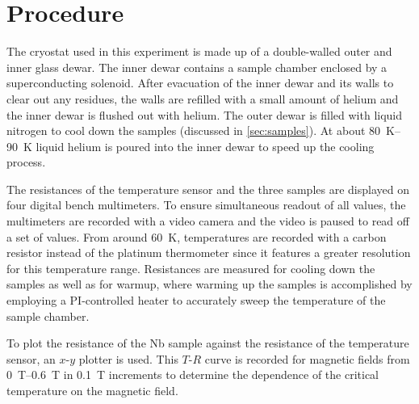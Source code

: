 \chapter{Procedure}
The cryostat used in this experiment is made up of a double-walled outer and inner glass dewar.
The inner dewar contains a sample chamber enclosed by a superconducting solenoid.
After evacuation of the inner dewar and its walls to clear out any residues, the walls are refilled with a small amount of helium and the inner dewar is flushed out with helium.
The outer dewar is filled with liquid nitrogen to cool down the samples (discussed in \autoref{sec:samples}).
At about \SIrange{80}{90}{\kelvin} liquid helium is poured into the inner dewar to speed up the cooling process.

The resistances of the temperature sensor and the three samples are displayed on four digital bench multimeters.
To ensure simultaneous readout of all values, the multimeters are recorded with a video camera and the video is paused to read off a set of values.
From around \SI{60}{\kelvin}, temperatures are recorded with a carbon resistor instead of the platinum thermometer since it features a greater resolution for this temperature range.
Resistances are measured for cooling down the samples as well as for warmup, where warming up the samples is accomplished by employing a PI-controlled heater to accurately sweep the temperature of the sample chamber.

To plot the resistance of the Nb sample against the resistance of the temperature sensor, an $x$-$y$ plotter is used.
This $T$-$R$ curve is recorded for magnetic fields from \SIrange{0}{0.6}{\tesla} in \SI{0.1}{\tesla} increments to determine the dependence of the critical temperature on the magnetic field.
